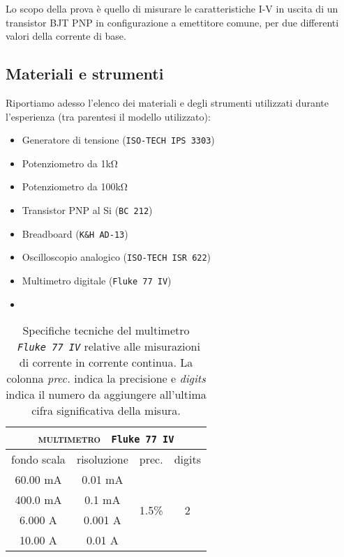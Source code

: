 Lo scopo della prova è quello di misurare le caratteristiche I-V in uscita di un transistor BJT PNP in configurazione a emettitore comune, per due differenti valori della corrente di base.

\subsection{Materiali e strumenti}
Riportiamo adesso l'elenco dei materiali e degli strumenti utilizzati durante l’esperienza (tra parentesi il modello utilizzato):
\begin{multicols}{2}
    \begin{itemize}
         \item Generatore di tensione (\verb|ISO-TECH IPS 3303|)
        \item Potenziometro da 1\si{\kilo\ohm}
        \item Potenziometro da 100\si{\kilo\ohm}
        \item Transistor PNP al Si (\verb|BC 212|)
        \item Breadboard (\verb|K&H AD-13|)
        \item Oscilloscopio analogico (\verb|ISO-TECH ISR 622|)
        \item Multimetro digitale (\verb|Fluke 77 IV|)
        \item [\vspace{\fill}]
    \end{itemize}
\end{multicols}

\begin{table}[h]
    \centering
    \begin{tabular}{||c|c|c|c||}
        \hline\hline
        \multicolumn{4}{||c||}{\textsc{multimetro} \ \texttt{Fluke 77 IV}}\\
        \hline\hline
        fondo scala & risoluzione & prec. & digits \\\hline
        60.00 \si{\milli\ampere} & 0.01 \si{\milli\ampere} & \multirow{4}{*}{1.5\%} & \multirow{4}{*}{2}\\
        400.0 \si{\milli\ampere} & 0.1 \si{\milli\ampere} &  & \\
        6.000 \si{\ampere} & 0.001 \si{\ampere} &  & \\
        10.00 \si{\ampere} & 0.01 \si{\ampere} &  & \\
        \hline\hline
    \end{tabular}
    \caption{Specifiche tecniche del multimetro \ \emph{\texttt{Fluke 77 IV}} relative alle misurazioni di corrente in corrente continua. La colonna \emph{prec.} indica la precisione e \emph{digits} indica il numero da aggiungere all'ultima cifra significativa della misura.}
    \label{tab:multimetro}
\end{table}

